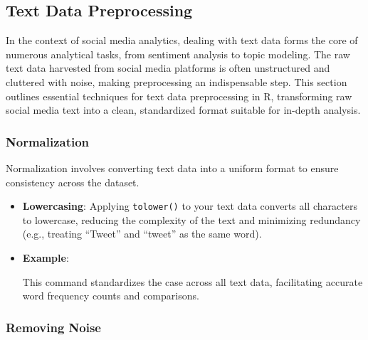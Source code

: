 \documentclass[
]{book}
\newenvironment{Shaded}{\begin{snugshade}}{\end{snugshade}}
\newcommand{\FunctionTok}[1]{\textcolor[rgb]{0.13,0.29,0.53}{\textbf{#1}}}
\newcommand{\NormalTok}[1]{#1}
\newcommand{\OtherTok}[1]{\textcolor[rgb]{0.56,0.35,0.01}{#1}}
\newcommand{\SpecialCharTok}[1]{\textcolor[rgb]{0.81,0.36,0.00}{\textbf{#1}}}
\begin{document}
\hypertarget{text-data-preprocessing}{%
\subsection{Text Data Preprocessing}\label{text-data-preprocessing}}

In the context of social media analytics, dealing with text data forms the core of numerous analytical tasks, from sentiment analysis to topic modeling. The raw text data harvested from social media platforms is often unstructured and cluttered with noise, making preprocessing an indispensable step. This section outlines essential techniques for text data preprocessing in R, transforming raw social media text into a clean, standardized format suitable for in-depth analysis.

\hypertarget{normalization}{%
\subsubsection{Normalization}\label{normalization}}

Normalization involves converting text data into a uniform format to ensure consistency across the dataset.

\begin{itemize}
\item
  \textbf{Lowercasing}: Applying \texttt{tolower()} to your text data converts all characters to lowercase, reducing the complexity of the text and minimizing redundancy (e.g., treating ``Tweet'' and ``tweet'' as the same word).
\item
  \textbf{Example}:

\begin{Shaded}
\end{Shaded}

  This command standardizes the case across all text data, facilitating accurate word frequency counts and comparisons.
\end{itemize}

\hypertarget{removing-noise}{%
\subsubsection{Removing Noise}\label{removing-noise}}
\end{document}
